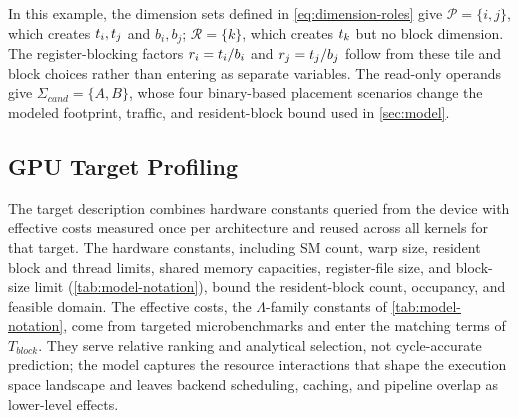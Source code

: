 In this example, the dimension sets defined in \autoref{eq:dimension-roles} give \(\mathcal{P}=\{i,j\}\), which creates \(t_i,t_j\) and \(b_i,b_j\); \(\mathcal{R}=\{k\}\), which creates \(t_k\) but no block dimension. The register-blocking factors \(r_i=t_i/b_i\) and \(r_j=t_j/b_j\) follow from these tile and block choices rather than entering as separate variables. The read-only operands give \(\Sigma_{\mathit{cand}}=\{A,B\}\), whose four binary-based placement scenarios change the modeled footprint, traffic, and resident-block bound used in \autoref{sec:model}.

\subsection{GPU Target Profiling}
\label{sec:gpu-target-profiling}

The target description combines hardware constants queried from the device with effective costs measured once per architecture and reused across all kernels for that target. The hardware constants, including SM count, warp size, resident block and thread limits, shared memory capacities, register-file size, and block-size limit (\autoref{tab:model-notation}), bound the resident-block count, occupancy, and feasible domain. The effective costs, the \(\Lambda\)-family constants of \autoref{tab:model-notation}, come from targeted microbenchmarks and enter the matching terms of \(T_{\mathit{block}}\). They serve relative ranking and analytical selection, not cycle-accurate prediction; the model captures the resource interactions that shape the execution space landscape and leaves backend scheduling, caching, and pipeline overlap as lower-level effects.

